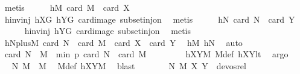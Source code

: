 \begin{isabellebody}
\ metis\isanewline
\ \ \isamarkupfalse%
\ \isamarkupfalse%
\ hM{\isacharcolon}{\kern0pt}\ {\isachardoublequoteopen}card\ {\isacharquery}{\kern0pt}M\ {\isacharequal}{\kern0pt}\ card\ X{\isachardoublequoteclose}\isanewline
\ \ \ \ \isamarkupfalse%
\ hinvinj\ hXG\ hYG\ card{\isacharunderscore}{\kern0pt}image\ subset{\isacharunderscore}{\kern0pt}inj{\isacharunderscore}{\kern0pt}on\ \isamarkupfalse%
\ metis\isanewline
\ \ \isamarkupfalse%
\ \isamarkupfalse%
\ hN{\isacharcolon}{\kern0pt}\ {\isachardoublequoteopen}card\ {\isacharquery}{\kern0pt}N\ {\isacharequal}{\kern0pt}\ card\ Y{\isachardoublequoteclose}\ \isanewline
\ \ \ \ \isamarkupfalse%
\ hinvinj\ hYG\ card{\isacharunderscore}{\kern0pt}image\ subset{\isacharunderscore}{\kern0pt}inj{\isacharunderscore}{\kern0pt}on\ \isamarkupfalse%
\ metis\isanewline
\ \ \isamarkupfalse%
\ \isamarkupfalse%
\ hNplusM{\isacharcolon}{\kern0pt}\ {\isachardoublequoteopen}card\ {\isacharquery}{\kern0pt}N\ {\isacharplus}{\kern0pt}\ card\ {\isacharquery}{\kern0pt}M\ {\isacharequal}{\kern0pt}\ card\ X\ {\isacharplus}{\kern0pt}\ card\ Y{\isachardoublequoteclose}\ \isamarkupfalse%
\ hM\ hN\ \isamarkupfalse%
\ auto\isanewline
\ \ \isamarkupfalse%
\ \isamarkupfalse%
\ {\isachardoublequoteopen}card\ {\isacharparenleft}{\kern0pt}{\isacharquery}{\kern0pt}N\ {\isasymcdots}\ {\isacharquery}{\kern0pt}M{\isacharparenright}{\kern0pt}\ {\isacharless}{\kern0pt}\ min\ p\ {\isacharparenleft}{\kern0pt}card\ {\isacharquery}{\kern0pt}N\ {\isacharplus}{\kern0pt}\ card\ {\isacharquery}{\kern0pt}M\ {\isacharminus}{\kern0pt}\ {}{\isacharparenright}{\kern0pt}{\isachardoublequoteclose}\ \isanewline
\ \ \ \ \isamarkupfalse%
\ hXYM\ M{\isacharunderscore}{\kern0pt}def\ hXYlt\ \isamarkupfalse%
\ argo\isanewline
\ \ \isamarkupfalse%
\ \isamarkupfalse%
\ {\isachardoublequoteopen}{\isacharparenleft}{\kern0pt}{\isacharquery}{\kern0pt}N{\isacharcomma}{\kern0pt}\ {\isacharquery}{\kern0pt}M{\isacharparenright}{\kern0pt}\ {\isasymin}\ M{\isachardoublequoteclose}\ \isamarkupfalse%
\ M{\isacharunderscore}{\kern0pt}def\ hXYM\ \isamarkupfalse%
\ blast\isanewline
\ \ \ \ \isamarkupfalse%
\ \isamarkupfalse%
\ {\isachardoublequoteopen}{\isacharparenleft}{\kern0pt}{\isacharparenleft}{\kern0pt}{\isacharquery}{\kern0pt}N{\isacharcomma}{\kern0pt}\ {\isacharquery}{\kern0pt}M{\isacharparenright}{\kern0pt}{\isacharcomma}{\kern0pt}\ {\isacharparenleft}{\kern0pt}X{\isacharcomma}{\kern0pt}\ Y{\isacharparenright}{\kern0pt}{\isacharparenright}{\kern0pt}\ {\isasymnotin}\ devos{\isacharunderscore}{\kern0pt}rel{\isachardoublequoteclose}\ \isamarkupfalse%

\end{isabellebody}
